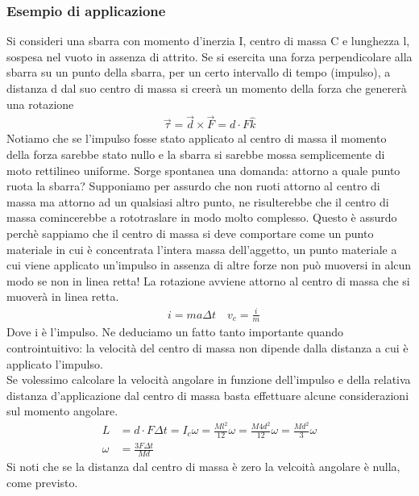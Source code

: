 \subsubsection{Esempio di applicazione}
Si consideri una sbarra con momento d'inerzia I, centro di massa C e lunghezza l, sospesa nel vuoto in assenza di attrito. Se si esercita una forza perpendicolare alla sbarra su un punto della sbarra, per un certo intervallo di tempo (impulso), a distanza d dal suo centro di massa si creerà un momento della forza che genererà una rotazione
\begin{align*}
	\vec{\tau} = \vec{d}\times\vec{F} = d \cdot F \hat{k}
\end{align*} 
Notiamo che se l'impulso fosse stato applicato al centro di massa il momento della forza sarebbe stato nullo e la sbarra si sarebbe mossa semplicemente di moto rettilineo uniforme. Sorge spontanea una domanda: attorno a quale punto ruota la sbarra? Supponiamo per assurdo che non ruoti attorno al centro di massa ma attorno ad un qualsiasi altro punto, ne risulterebbe che il centro di massa comincerebbe a rototraslare in modo molto complesso. Questo è assurdo perchè sappiamo che il centro di massa si deve comportare come un punto materiale in cui è concentrata l'intera massa dell'aggetto, un punto materiale a cui viene applicato un'impulso in assenza di altre forze non può muoversi in alcun modo se non in linea retta! La rotazione avviene attorno al centro di massa che si muoverà in linea retta.
\begin{align*}
	&i = m a \Delta t \quad v_c = \frac{i}{m}
\end{align*} 
Dove i è l'impulso. Ne deduciamo un fatto tanto importante quando controintuitivo: la velocità del centro di massa non dipende dalla distanza a cui è applicato l'impulso.\\
Se volessimo calcolare la velocità angolare in funzione dell'impulso e della relativa distanza d'applicazione dal centro di massa basta effettuare alcune considerazioni sul momento angolare.  
\begin{align*}
	L &= d \cdot F \Delta t = I_c \omega = \frac{M l^2}{12} \omega= \frac{M4d^2}{12}\omega= \frac{M d^2}{3}\omega\\
	\omega &= \frac{3 F \Delta t}{M d}
\end{align*}
Si noti che se la distanza dal centro di massa è zero la velcoità angolare è nulla, come previsto. 

